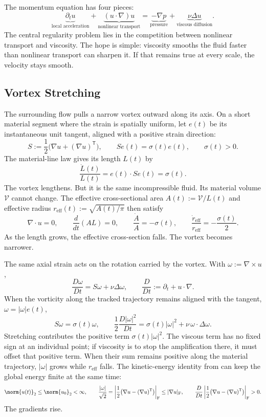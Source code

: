 
The momentum equation has four pieces:
\[
  \underbrace{\partial_t u}_{\text{local acceleration}}
  +
  \underbrace{(u\cdot\nabla)u}_{\text{nonlinear transport}}
  =
  \underbrace{-\nabla p}_{\text{pressure}}
  +
  \underbrace{\nu\Delta u}_{\text{viscous diffusion}}.
\]
The central regularity problem lies in the competition between nonlinear transport and viscosity.
The hope is simple: viscosity smooths the fluid faster than nonlinear transport can sharpen it.
If that remains true at every scale, the velocity stays smooth.

\subsection{Vortex Stretching}\label{sub:ThePerfectlyStretchingVortex}

The surrounding flow pulls a narrow vortex outward along its axis.
On a short material segment where the strain is spatially uniform, let \(e(t)\) be its instantaneous unit tangent, aligned with a positive strain direction:
\[
  S:=\frac12\bigl(\nabla u+(\nabla u)^{\mathsf T}\bigr),
  \qquad
  Se(t)=\sigma(t)e(t),
  \qquad
  \sigma(t)>0.
\]
The material-line law gives its length \(L(t)\) by
\[
  \frac{\dot L(t)}{L(t)}
  =
  e(t)\cdot Se(t)
  =
  \sigma(t).
\]
The vortex lengthens.
But it is the same incompressible fluid.
Its material volume \(\mathcal V\) cannot change.
The effective cross-sectional area \(A(t):=\mathcal V/L(t)\) and effective radius \(r_{\mathrm{eff}}(t):=\sqrt{A(t)/\pi}\) then satisfy
\[
  \nabla\cdot u=0,
  \qquad
  \frac{d}{dt}(A L)=0,
  \qquad
  \frac{\dot A}{A}=-\sigma(t),
  \qquad
  \frac{\dot r_{\mathrm{eff}}}{r_{\mathrm{eff}}}
  =
  -\frac{\sigma(t)}{2}.
\]
As the length grows, the effective cross-section falls.
The vortex becomes narrower.

The same axial strain acts on the rotation carried by the vortex.
With \(\omega:=\nabla\times u\),
\[
  \frac{D\omega}{Dt}
  =
  S\omega+\nu\Delta\omega,
  \qquad
  \frac{D}{Dt}
  :=
  \partial_t+u\cdot\nabla.
\]
When the vorticity along the tracked trajectory remains aligned with the tangent, \(\omega=|\omega|e(t)\),
\[
  S\omega
  =
  \sigma(t)\omega,
  \qquad
  \frac12\frac{D|\omega|^2}{Dt}
  =
  \sigma(t)|\omega|^2
  +
  \nu\,\omega\cdot\Delta\omega.
\]
Stretching contributes the positive term \(\sigma(t)|\omega|^2\).
The viscous term has no fixed sign at an individual point; if viscosity is to stop the amplification there, it must offset that positive term.
When their sum remains positive along the material trajectory, \(|\omega|\) grows while \(r_{\mathrm{eff}}\) falls.
The kinetic-energy identity from  can keep the global energy finite at the same time:
\[
  \norm{u(t)}_2
  \leq
  \norm{u_0}_2
  <
  \infty,
  \qquad
  \frac{|\omega|}{\sqrt2}
  =
  \left|\frac12\bigl(\nabla u-(\nabla u)^{\mathsf T}\bigr)\right|_{\mathrm F}
  \leq
  |\nabla u|_{\mathrm F},
  \qquad
  \frac{D}{Dt}
  \left|\frac12\bigl(\nabla u-(\nabla u)^{\mathsf T}\bigr)\right|_{\mathrm F}
  >
  0.
\]
The gradients rise.

